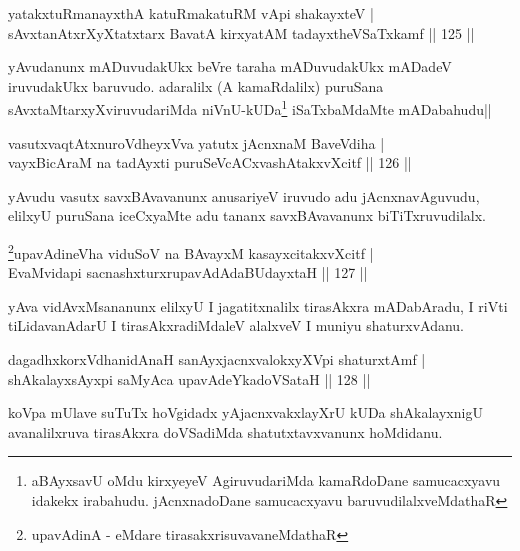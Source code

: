 
\begin{shl}
yatakxtuRmanayxthA katuRmakatuRM vA\s pi shakayxteV |\\
sAvxtanAtxrXyXtatxtarx BavatA kirxyatAM tadayxtheVSaTxkamf \hfill || 125 ||
\end{shl}

\begin{artha}
yAvudanunx mADuvudakUkx beVre taraha mADuvudakUkx mADadeV iruvudakUkx baruvudo. adaralilx (A kamaRdalilx) puruSana sAvxtaMtarxyXviruvudariMda niVnU-kUDa\footnote{aBAyxsavU oMdu kirxyeyeV AgiruvudariMda kamaRdoDane samucacxyavu idakekx irabahudu. jAcnxnadoDane samucacxyavu baruvudilalxveMdathaR} iSaTxbaMdaMte mADabahudu||
\end{artha}

\begin{shl}
vasutxvaqtAtxnuroVdheyxVva yatutx jAcnxnaM BaveVdiha |\\
vayxBicAraM na tadAyxti puruSeVcACxvashAtakxvXcitf \hfill || 126 ||
\end{shl}	

\begin{artha}
yAvudu vasutx savxBAvavanunx anusariyeV iruvudo adu jAcnxnavAguvudu, elilxyU puruSana iceCxyaMte adu tananx savxBAvavanunx biTiTxruvudilalx.
\end{artha}


\begin{shl}
\footnote{upavAdinA - eMdare tirasakxrisuvavaneMdathaR}upavAdineVha viduSoV na BAvayxM kasayxcitakxvXcitf |\\
EvaMvidapi sacnashxturxrupavAdAdaBUdayxtaH \hfill || 127 ||
\end{shl}

\begin{artha}
yAva vidAvxMsananunx elilxyU I jagatitxnalilx tirasAkxra mADabAradu, I riVti tiLidavanAdarU I tirasAkxradiMdaleV alalxveV I muniyu shaturxvAdanu.
\end{artha}

\begin{shl}
dagadhxkorxVdhanidAnaH sanAyxjacnxvalokxyXV\s pi shaturxtAmf |\\
shAkalayxsAyxpi saMyAca upavAdeYkadoVSataH \hfill || 128 ||
\end{shl}

\begin{artha}
koVpa mUlave suTuTx hoVgidadx yAjacnxvakxlayXrU kUDa shAkalayxnigU avanalilxruva tirasAkxra doVSadiMda shatutxtavxvanunx hoMdidanu.
\end{artha}%

